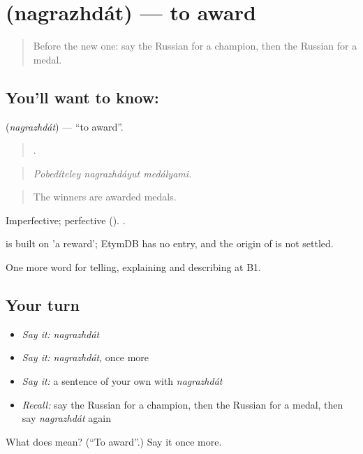 \section[\texorpdfstring{\ru{награждать} (nagrazhdát)}{награждать (nagrazhdát)}]{ (nagrazhdát) — to award}

\label{lesson:RU-C511-nagrazhdat}



\begin{quote}
Before the new one: say the Russian for a champion, then the Russian for a medal.
\end{quote}

\subsection*{You'll want to know: }
\textbf{} (\emph{nagrazhdát}) — \textquotedblleft{}to award\textquotedblright{}.

\begin{quote}
  .
\end{quote}

\begin{quote}
\emph{Pobedíteley nagrazhdáyut medályami.}
\end{quote}

\begin{quote}
The winners are awarded medals.
\end{quote}

Imperfective; perfective  (). \emph{  }.

\begin{cousinweb}
\emph{} is built on \emph{} 'a reward'; EtymDB has no entry, and the origin of \emph{} is not settled.
\end{cousinweb}

\begin{grammarlens}[title={What you've built}]
One more word for telling, explaining and describing at B1.
\end{grammarlens}

\subsection*{Your turn}
\begin{itemize}
\raggedright
  \item \emph{Say it:} \emph{nagrazhdát}
  \item \emph{Say it:} \emph{nagrazhdát}, once more
  \item \emph{Say it:} a sentence of your own with \emph{nagrazhdát}
  \item \emph{Recall:} say the Russian for a champion, then the Russian for a medal, then say \emph{nagrazhdát} again
\end{itemize}

\begin{tcolorbox}[breakable,colback=teal!4,colframe=teal!35!black,title={Before you move on}]
What does  mean? (\textquotedblleft{}To award\textquotedblright{}.) Say it once more.
\end{tcolorbox}
